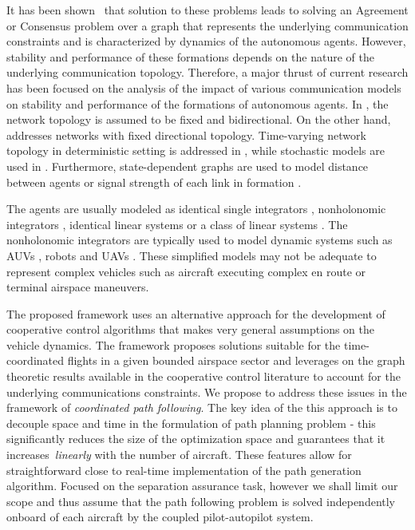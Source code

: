 \documentclass[letter,onecolumn,12pt]{aiaa-tc}
\newcommand{\1}{1_n}
\begin{document}
It has been shown~\cite{jadbabaie03,tanner05,saber07} that solution to these
problems leads to solving an Agreement or Consensus problem over a graph that represents the underlying communication
constraints and is characterized by dynamics of the autonomous agents. However, stability and
performance of these formations depends on the nature of the underlying communication topology.  Therefore, a major thrust of current research has been focused on the analysis of the impact of various communication models on stability and performance of the formations of autonomous agents. In \cite{fax04}, the network topology is assumed to be fixed and bidirectional. On the other hand, \cite{Francis-directed} addresses networks with fixed directional topology. Time-varying network topology in deterministic setting is addressed in \cite{jadbabaie03,Moreau,lin05}, while  stochastic models are used in \cite{mesbahi, Stilwell, Stilwell2}. Furthermore, state-dependent graphs are used to model distance between agents
or signal strength of each link in formation \cite{mesbahi}.

The agents are usually modeled as identical single integrators \cite{jadbabaie03,Moreau},  nonholonomic integrators
\cite{ Francis-directed,beard:coop-book,Leonard}, identical linear systems \cite{fax04} or a class of linear systems
\cite{dandrea}. The nonholonomic integrators are typically used to model dynamic systems such as AUVs \cite{Leonard},
robots \cite{Francis-directed,lin05} and UAVs \cite{mclain,beard:coop-book}. These simplified models may not
be adequate to represent complex vehicles such as aircraft executing complex en route or terminal airspace maneuvers.

The proposed framework uses an alternative approach for the development of cooperative control algorithms that makes
very general assumptions on the vehicle dynamics. The framework proposes solutions suitable for the time-coordinated flights in a given bounded airspace sector and leverages on the graph theoretic results available in the cooperative control literature to account for the underlying communications constraints. We propose to address these issues in the
framework of {\it coordinated path following}. The key idea of the this approach is to decouple space and time in the formulation of path planning problem - this significantly reduces the size of the optimization space and guarantees that it increases~\emph{linearly} with the number of aircraft. These features allow for straightforward close to real-time implementation of the path generation algorithm. Focused on the separation assurance task, however we shall limit our scope and thus assume that the path following problem is solved independently onboard of each aircraft by the coupled pilot-autopilot system.
\end{document}
